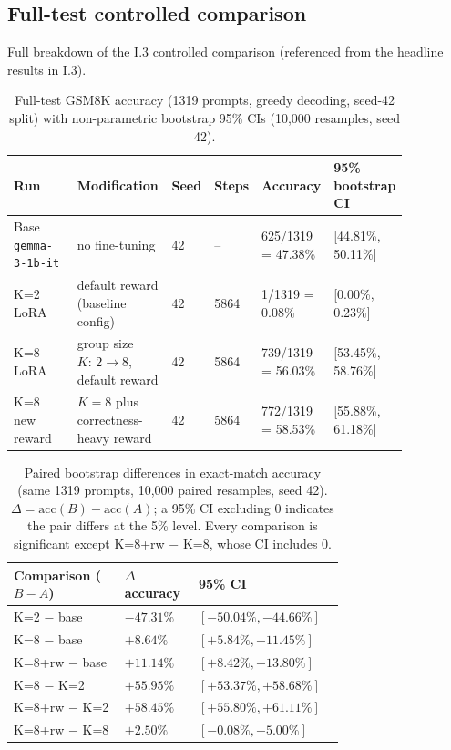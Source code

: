 \subsection{Full-test controlled comparison}
\label{app:results}

Full breakdown of the I.3 controlled comparison (referenced from the headline results in I.3).

\begin{table}[htbp]
\centering
\scriptsize
\setlength{\tabcolsep}{3pt}
\begin{tabular}{@{}L{0.17\linewidth}L{0.24\linewidth}L{0.07\linewidth}L{0.08\linewidth}L{0.15\linewidth}L{0.15\linewidth}@{}}
\toprule
Run & Modification & Seed & Steps & Accuracy & 95\% bootstrap CI \\
\midrule
Base \texttt{gemma-3-1b-it} & no fine-tuning & 42 & -- & 625/1319 = 47.38\% & [44.81\%, 50.11\%] \\
K=2 LoRA & default reward (baseline config) & 42 & 5864 & 1/1319 = 0.08\% & [0.00\%, 0.23\%] \\
K=8 LoRA & group size $K{:}\,2\to8$, default reward & 42 & 5864 & 739/1319 = 56.03\% & [53.45\%, 58.76\%] \\
K=8 new reward & $K=8$ plus correctness-heavy reward & 42 & 5864 & 772/1319 = 58.53\% & [55.88\%, 61.18\%] \\
\bottomrule
\end{tabular}
\caption{Full-test GSM8K accuracy (1319 prompts, greedy decoding, seed-42 split) with
non-parametric bootstrap 95\% CIs (10{,}000 resamples, seed 42).}
\label{tab:controlled-comparison}
\end{table}

\begin{table}[htbp]
\centering
\scriptsize
\setlength{\tabcolsep}{6pt}
\begin{tabular}{@{}L{0.30\linewidth}L{0.14\linewidth}L{0.28\linewidth}@{}}
\toprule
Comparison ($B-A$) & $\Delta$ accuracy & 95\% CI \\
\midrule
K=2 $-$ base    & $-47.31\%$ & $[-50.04\%, -44.66\%]$ \\
K=8 $-$ base    & $+8.64\%$  & $[+5.84\%, +11.45\%]$  \\
K=8+rw $-$ base & $+11.14\%$ & $[+8.42\%, +13.80\%]$  \\
K=8 $-$ K=2     & $+55.95\%$ & $[+53.37\%, +58.68\%]$ \\
K=8+rw $-$ K=2  & $+58.45\%$ & $[+55.80\%, +61.11\%]$ \\
K=8+rw $-$ K=8  & $+2.50\%$  & $[-0.08\%, +5.00\%]$   \\
\bottomrule
\end{tabular}
\caption{Paired bootstrap differences in exact-match accuracy (same 1319 prompts, 10{,}000 paired
resamples, seed 42). $\Delta = \mathrm{acc}(B)-\mathrm{acc}(A)$; a 95\% CI excluding 0 indicates the
pair differs at the 5\% level. Every comparison is significant except K=8+rw $-$ K=8, whose CI
includes 0.}
\label{tab:paired-diffs}
\end{table}
